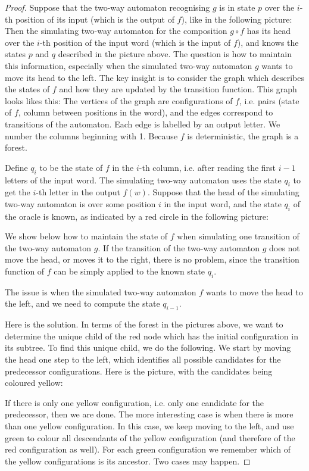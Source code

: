 \begin{proof}
Suppose that the two-way automaton recognising $g$ is in state $p$ over  the $i$-th position of its input (which is the output of $f$), like in the following picture: 
 	Then the simulating two-way  automaton for the composition $g \circ f$ has its head over the $i$-th position of the input word (which is the input of $f$), and knows the states $p$ and $q$ described in the picture above.
	The question is how to maintain this information, especially when the simulated two-way automaton $g$ wants to move its head to the left.
The key insight is to consider the graph which describes the states of $f$ and how they are updated by the transition function. This graph looks likes this:
The vertices of the graph are configurations of $f$, i.e. pairs (state of $f$, column between positions in the word), and the edges correspond to transitions of the automaton. Each edge is labelled by an output letter. We number the columns beginning with 1. Because $f$ is deterministic, the graph is a forest.

Define $q_i$ to be the state of $f$  in the $i$-th column, i.e. after reading the first $i-1$ letters of the input word. The simulating  two-way automaton  uses the state $q_{i}$ to get the $i$-th letter in the output $f(w)$. Suppose that the head of the simulating two-way automaton is over some position $i$ in the input word, and the state $q_{i}$ of the oracle is known, as indicated by a red circle in the following picture:

We show below how to maintain the state of $f$  when simulating  one transition of the two-way automaton $g$. If the transition of the two-way automaton $g$ does not move the head, or moves it to the right, there is no problem, since the transition function of $f$ can be simply applied to the known state $q_i$.

The issue is when the simulated two-way automaton $f$ wants to move the head to the left, and we need to compute the state $q_{i-1}$. 

Here is the solution. In terms of the forest in the pictures above, we want to determine the unique child of the red node which has the initial configuration in its subtree. To find this unique child, we do the following.
We start by moving the head one step to the left, which identifies all possible candidates for the predecessor configurations. Here is the picture, with the candidates being coloured yellow:  


If there is only one yellow configuration, i.e. only one candidate for the predecessor, then we are done. The more interesting case is when there is more than one yellow configuration. In this case, we keep moving to the left, and use green to colour all descendants of the yellow configuration (and therefore of the red configuration as well). For each green configuration we remember which of the yellow configurations is its ancestor.  Two cases may happen. 


\end{proof}
